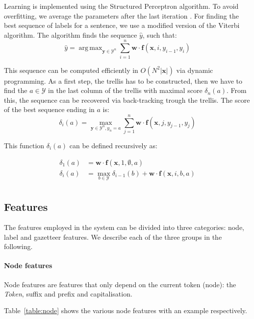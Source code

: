 \documentclass[11pt]{article}
\DeclareMathOperator*{\argmax}{arg\,max}
\begin{document}
Learning is implemented using the Structured Perceptron algorithm. To avoid overfitting, we average the parameters after the last iteration \cite{collins2002discriminative}. 
For finding the best sequence of labels for a sentence, we use a modified version of the Viterbi algorithm. The algorithm finds the sequence $\hat{y}$, such that:
\[
\hat{y} = \argmax_{\mathbf{y} \in \mathcal{Y}^{n}} \sum_{i=1}^{n}\mathbf{w} \cdot \boldsymbol{f}(\mathbf{x}, i, y_{i-1}, y_{i})
\]

This sequence can be computed efficiently in $ O( N^2 |\mathbf{x}| ) $ via dynamic programming. 
As a first step, the trellis has to be constructed, then we have to find the $ a \in \mathcal{Y}$ in the 
last column of the trellis with maximal score $\delta_n(a)$. From this, the sequence can be recovered via back-tracking trough the trellis. 
The score of the best sequence ending in $a$ is:
\[
\delta_i(a) = \max_{\mathbf{y} \in \mathcal{Y}^{n}, y_n = a} \sum_{j=1}^{n}{\mathbf{w} \cdot \boldsymbol{f}(\mathbf{x}, j, y_{j-1}, y_{j})}
\]

\noindent This function $\delta_i(a)$ can be defined recursively as:

\begin{align*}
\delta_1(a) &= \mathbf{w} \cdot \boldsymbol{f}(\mathbf{x}, 1, \emptyset, a) \\
\delta_i(a) &= \max_{b \in \mathcal{Y}} \delta_{i-1}(b) + \mathbf{w} \cdot \boldsymbol{f}(\mathbf{x}, i, b, a) \\
\end{align*}


\subsection{Features}
The features employed in the system can be divided into three categories: node, label and gazetteer features. 
We describe each of the three groups in the following.

\paragraph*{Node features}
Node features are features that only depend on the current token (node): the \emph{Token}, suffix and prefix and capitalisation.

Table~\ref{table:node} shows the various node features with an example respectively.
\end{document}

